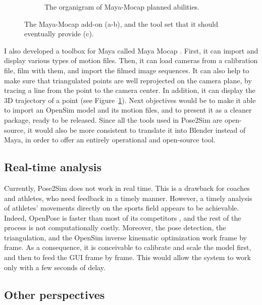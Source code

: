 \begin{figure}[hbtp!]
\begin{subfigure}[b]{1\textwidth}
            \caption{The organigram of Maya-Mocap planned abilities.}
      \end{subfigure}
 	\caption{The Maya-Mocap add-on (a-b), and the tool set that it should eventually provide (c).}
	\label{fig_mayamocap}
\end{figure}

I also developed a toolbox for Maya \cite{Maya1998} called Maya Mocap \cite{Pagnon2020}. First, it can import and display various types of motion files. Then, it can load cameras from a calibration file, film with them, and import the filmed image sequences. It can also help to make sure that triangulated points are well reprojected on the camera plane, by tracing a line from the point to the camera center. In addition, it can display the 3D trajectory of a point (see Figure~\ref{fig_mayamocap}). Next objectives would be to make it able to import an OpenSim model and its motion files, and to present it as a cleaner package, ready to be released. Since all the tools used in Pose2Sim are open-source, it would also be more consistent to translate it into Blender instead of Maya, in order to offer an entirely operational and open-source tool.


\subsection{Real-time analysis}\label{subsec:realtime}

Currently, Pose2Sim does not work in real time. This is a drawback for coaches and athletes, who need feedback in a timely manner. However, a timely analysis of athletes’ movements directly on the sports field appears to be achievable. Indeed, OpenPose is faster than most of its competitors \cite{Chen2020}, and the rest of the process is not computationally costly. Moreover, the pose detection, the triangulation, and the OpenSim inverse kinematic optimization work frame by frame. As a consequence, it is conceivable to calibrate and scale the model first, and then to feed the GUI frame by frame. This would allow the system to work only with a few seconds of delay.


\subsection{Other perspectives}

